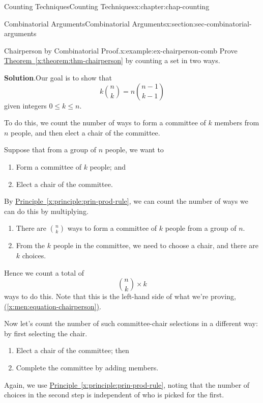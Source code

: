 \documentclass[oneside,10pt,]{book}
\newcommand{\blocktitlefont}{\relax}
\newcommand{\xreffont}{\relax}
\numberwithin{equation}{section}
\begin{document}
\begin{chapterptx}{Counting Techniques}{}{Counting Techniques}{}{}{x:chapter:chap-counting}
\begin{sectionptx}{Combinatorial Arguments}{}{Combinatorial Arguments}{}{}{x:section:sec-combinatorial-arguments}
\begin{example}{Chairperson by Combinatorial Proof.}{x:example:ex-chairperson-comb}%
Prove \hyperref[x:theorem:thm-chairperson]{Theorem~{\xreffont\ref{x:theorem:thm-chairperson}}} by counting a set in two ways.%
\par\smallskip%
\noindent\textbf{\blocktitlefont Solution}.\hypertarget{g:solution:id237923}{}\quad{}Our goal is to show that%
\begin{equation}
k\binom{n}{k} = n\binom{n-1}{k-1}\label{x:men:equation-chairperson}
\end{equation}
given integers \(0 \leq k \leq n\).%
\par
To do this, we count the number of ways to form a committee of \(k\) members from \(n\) people, and then elect a chair of the committee.%
\par
Suppose that from a group of \(n\) people, we want to%
\begin{enumerate}
\item{}Form a committee of \(k\) people; and%
\item{}Elect a chair of the committee.%
\end{enumerate}
By \hyperref[x:principle:prin-prod-rule]{Principle~{\xreffont\ref{x:principle:prin-prod-rule}}}, we can count the number of ways we can do this by multiplying.%
\begin{enumerate}
\item{}There are \(\binom{n}{k}\) ways to form a committee of \(k\) people from a group of \(n\).%
\item{}From the \(k\) people in the committee, we need to choose a chair, and there are \(k\) choices.%
\end{enumerate}
Hence we count a total of%
\begin{equation*}
\binom{n}{k} \times k
\end{equation*}
ways to do this. Note that this is the left-hand side of what we're proving, \hyperref[x:men:equation-chairperson]{({\xreffont\ref{x:men:equation-chairperson}})}.%
\par
Now let's count the number of such committee-chair selections in a different way: by first selecting the chair.%
\begin{enumerate}
\item{}Elect a chair of the committee; then%
\item{}Complete the committee by adding members.%
\end{enumerate}
Again, we use \hyperref[x:principle:prin-prod-rule]{Principle~{\xreffont\ref{x:principle:prin-prod-rule}}}, noting that the number of choices in the second step is independent of who is picked for the first.%

\end{example}
\end{sectionptx}
\end{chapterptx}
\end{document}
